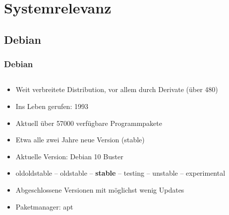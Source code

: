\documentclass[9pt]{beamer}
\begin{document}
\section{Systemrelevanz}
\subsection{Debian}
\begin{frame}
\frametitle{Debian}
\begin{columns}
    \begin{column}[c]{0.6\textwidth}

	\begin{itemize}
		\item Weit verbreitete Distribution, vor allem durch Derivate (über 480)
		\item Ins Leben gerufen: 1993
		\item Aktuell über 57000 verfügbare Programmpakete
		\item Etwa alle zwei Jahre neue Version (stable)
		\item Aktuelle Version: Debian 10 Buster
		\item oldoldstable -- oldstable -- \textbf{stable} -- testing -- unstable -- experimental
		\item Abgeschlossene Versionen mit möglichst wenig Updates
		\item Paketmanager: apt
	\end{itemize}
	\end{column}
	

\end{columns}
\end{frame}
\end{document}
